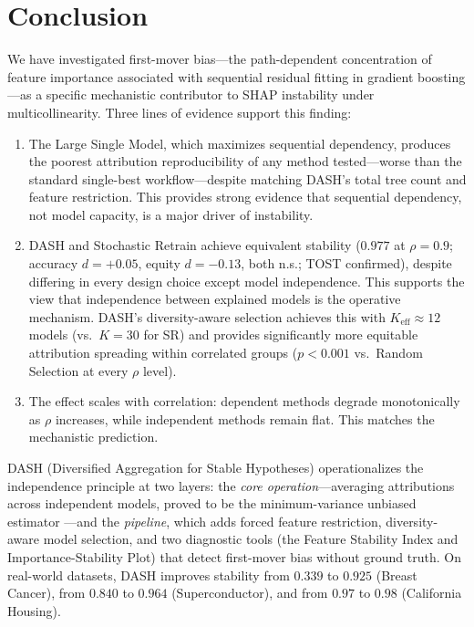 \documentclass[11pt]{article}
\newcommand{\dash}{\textsc{DASH}}
\newcommand{\rhovar}{\rho}
\begin{document}
\section{Conclusion}
\label{sec:conclusion}

We have investigated first-mover bias---the path-dependent concentration of
feature importance associated with sequential residual fitting in gradient
boosting---as a specific mechanistic contributor to SHAP instability under
multicollinearity. Three lines of evidence support this finding:

\begin{enumerate}
  \item The Large Single Model, which maximizes sequential dependency,
    produces the poorest attribution reproducibility of any method tested---worse
    than the standard single-best workflow---despite matching \dash{}'s
    total tree count and feature restriction. This provides strong evidence that
    sequential dependency, not model capacity, is a major driver of instability.
  \item \dash{} and Stochastic Retrain achieve equivalent
    stability ($0.977$ at $\rhovar = 0.9$; accuracy $d = +0.05$,
    equity $d = -0.13$, both n.s.; TOST confirmed),
    despite differing in every design choice except model independence.
    This supports the view that independence between explained models is the
    operative mechanism. \dash{}'s diversity-aware selection achieves this
    with $K_{\text{eff}} \approx 12$ models (vs.\ $K = 30$ for SR) and
    provides significantly more equitable attribution spreading within
    correlated groups ($p < 0.001$ vs.\ Random Selection at every
    $\rhovar$ level).
  \item The effect scales with correlation: dependent methods degrade
    monotonically as $\rhovar$ increases, while independent methods
    remain flat. This matches the mechanistic prediction.
\end{enumerate}

\dash{} (Diversified Aggregation for Stable Hypotheses) operationalizes the
independence principle at two layers: the \emph{core operation}---averaging
attributions across independent models, proved to be the minimum-variance
unbiased estimator \citep{caraker2026impossibility}---and the
\emph{pipeline}, which adds forced feature restriction, diversity-aware
model selection, and two diagnostic tools (the Feature Stability
Index and Importance-Stability Plot) that detect first-mover bias
without ground truth. On real-world datasets, \dash{} improves stability
from $0.339$ to $0.925$ (Breast Cancer), from $0.840$ to $0.964$
(Superconductor), and from $0.97$ to $0.98$ (California Housing).
\end{document}
